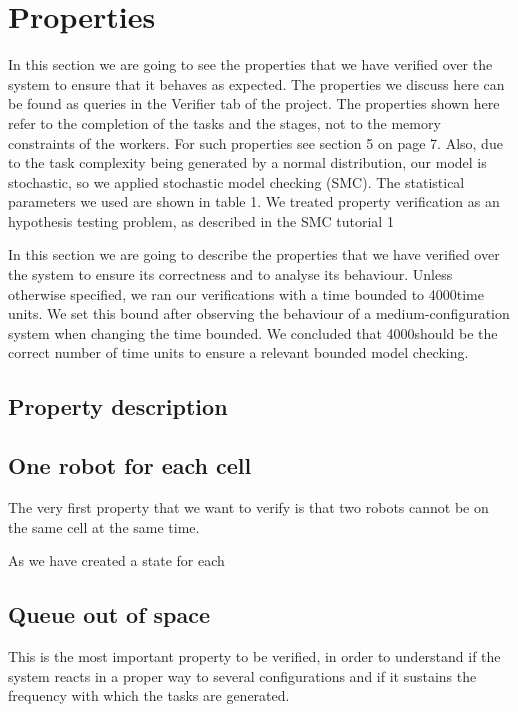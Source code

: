 \newcommand{\timebound}{4000}
\newcommand{\query}{[INSERIRE LA QUERY]}

\section{Properties}
In this section we are going to see the properties that we have verified over the system to ensure that
it behaves as expected. The properties we discuss here can be found as queries in the Verifier tab
of the project. The properties shown here refer to the completion of the tasks and the stages, not to
the memory constraints of the workers. For such properties see section 5 on page 7.
Also, due to the task complexity being generated by a normal distribution, our model is stochastic,
so we applied stochastic model checking (SMC). The statistical parameters we used are shown in
table 1. We treated property verification as an hypothesis testing problem, as described in the SMC
tutorial 1

In this section we are going to describe the properties that we have verified over the system to ensure its correctness and to analyse its behaviour. Unless otherwise specified, we ran our verifications with a time bounded to \timebound \space time units. We set this bound after observing the behaviour of a medium-configuration system when changing the time bounded. We concluded that \timebound \space should be the correct number of time units to ensure a relevant bounded model checking.

\subsection{Property description}

\subsection{One robot for each cell}
The very first property that we want to verify is that two robots cannot be on the same cell at the same time.

As we have created a state for each 


\subsection{Queue out of space}
This is the most important property to be verified, in order to understand if the system reacts in a proper way to several configurations and if it sustains the frequency with which the tasks are generated.

